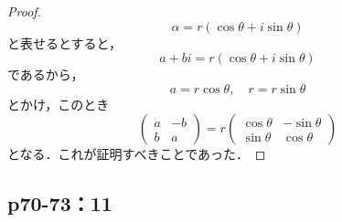 \documentclass[uplatex,dvipdfmx,a4paper,11pt,fleqn]{jsarticle}
\begin{document}
\begin{tleftbar} 
    \begin{proof}
    \[
        \alpha = r (\cos \theta + i \sin \theta)
    \]
    と表せるとすると，
    \[
        a+bi = r (\cos \theta + i \sin \theta ) 
    \]
    であるから，
    \[
        a= r \cos \theta , \quad r = r \sin \theta
    \]
    とかけ，このとき
    \[
        \begin{pmatrix} a & -b \\ b & a \end{pmatrix} = r \begin{pmatrix} \cos \theta & -\sin \theta \\ \sin \theta & \cos \theta \end{pmatrix}
    \]
    となる．これが証明すべきことであった．
    \end{proof}
\end{tleftbar}

\newpage 

\subsection*{p70-73：11}
\end{document}
